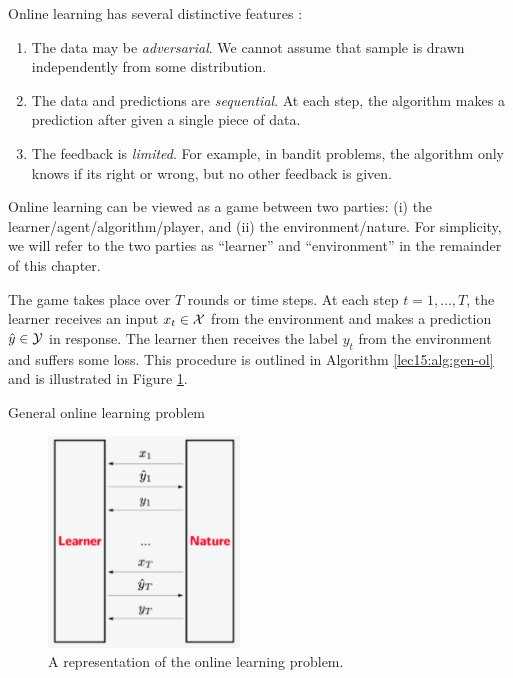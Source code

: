 Online learning has several distinctive features \cite{percynotes}:
\begin{enumerate}
\item The data may be \textit{adversarial}. We cannot assume that sample is drawn independently from some distribution.    
\item The data and predictions are \textit{sequential}. At each step, the algorithm makes a prediction after given a single piece of data.
\item The feedback is \textit{limited}. For example, in bandit problems, the algorithm only knows if its right or wrong, but no other feedback is given. 
\end{enumerate}

Online learning can be viewed as a game between two parties: (i) the learner/agent/algorithm/player, and (ii) the environment/nature. For simplicity, we will refer to the two parties as ``learner'' and ``environment'' in the remainder of this chapter.

The game takes place over $T$ rounds or time steps. At each step $t = 1, \dots, T$, the learner receives an input $x_t \in \mathcal X$ from the environment and makes a prediction $\hat{y} \in \mathcal Y$ in response. The learner then receives the label $y_t$ from the environment and suffers some loss. This procedure is outlined in Algorithm \ref{lec15:alg:gen-ol} and is illustrated in Figure \ref{lec15:fig:OLgame}.

    \begin{algorithm}[h]
        \caption{General online learning problem}
        \label{lec15:alg:gen-ol}
    \end{algorithm}

\begin{figure}[ht]
    \centering
    \includegraphics[width=2in]{figures/OLupdated.png}
    \caption{A representation of the online learning problem.}
    \label{lec15:fig:OLgame}
\end{figure}

